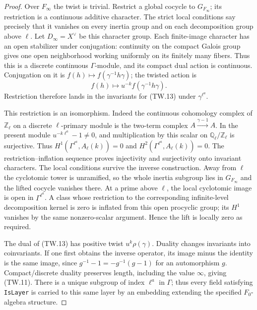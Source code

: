 \begin{proof}
Over $F_\infty$ the twist is trivial.  Restrict a global cocycle
to $G_{F_\infty}$; its restriction is a continuous additive
character.  The strict local conditions say precisely that it
vanishes on every inertia group and on each decomposition group
above $\ell$.  Let $D_\infty=X^\vee$ be this character group.
Each finite-image character has an open stabilizer under conjugation:
continuity on the compact Galois group gives one open neighborhood
working uniformly on its finitely many fibers.  Thus this is a
discrete continuous $\Gamma$-module, and its compact dual action
is continuous.  Conjugation on it is
$f(h)\mapsto f(\gamma^{-1}h\gamma)$; the twisted action is
\[
         f(h)\longmapsto u^{-k}f(\gamma^{-1}h\gamma).
 \tag{TW.13}
\]
Restriction therefore lands in the invariants for (TW.13)
under $\gamma^{\ell^a}$.

This restriction is an isomorphism.  Indeed the continuous
cohomology complex of $\mathbb Z_\ell$ on a discrete
$\ell$-primary module is the two-term complex
$A\xrightarrow{\gamma-1}A$.  In the present module
$u^{-k\ell^a}-1\ne0$, and multiplication by this scalar on
$\mathbb Q_\ell/\mathbb Z_\ell$ is surjective.
Thus $H^1(\Gamma^{\ell^a},A_\ell(k))=0$ and
$H^2(\Gamma^{\ell^a},A_\ell(k))=0$.
The restriction--inflation sequence proves injectivity and
surjectivity onto invariant characters.
The local conditions survive the inverse construction.
Away from $\ell$ the cyclotomic tower is unramified, so the
whole inertia subgroup lies in $G_{F_\infty}$ and the lifted
cocycle vanishes there.  At a prime above $\ell$, the local
cyclotomic image is open in $\Gamma^{\ell^a}$.
A class whose restriction to the corresponding infinite-level
decomposition kernel is zero is inflated from this open
procyclic group; its $H^1$ vanishes by the same nonzero-scalar
argument.  Hence the lift is locally zero as required.

The dual of (TW.13) has positive twist
$u^k\rho(\gamma)$.  Duality changes invariants into
coinvariants.  If one first obtains the inverse operator,
its image minus the identity is the same image, since
$g^{-1}-1=-g^{-1}(g-1)$ for an automorphism $g$.
Compact/discrete duality preserves length, including the value
$\infty$, giving (TW.11).  There is a unique subgroup of index
$\ell^a$ in $\Gamma$; thus every field satisfying
\texttt{IsLayer} is carried to this same layer by an embedding
extending the specified $F_0$-algebra structure.


\end{proof}
